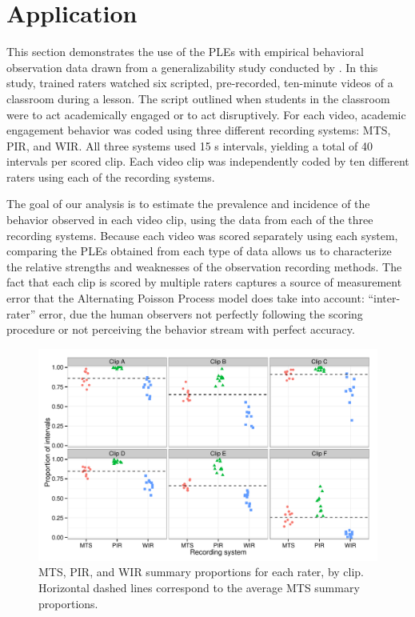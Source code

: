 \documentclass[man, noextraspace, floatsintext]{apa6}\usepackage[]{graphicx}\usepackage[]{color}
\makeatletter
\def\maxwidth{ %
  \ifdim\Gin@nat@width>\linewidth
    \linewidth
  \else
    \Gin@nat@width
  \fi
}
\newenvironment{knitrout}{}{} %
\makeatother
\begin{document}
\section{Application}
\label{sec:application}



This section demonstrates the use of the PLEs with empirical behavioral observation data drawn from a generalizability study conducted by \citet{Johnson2014}. 
In this study, trained raters watched six scripted, pre-recorded, ten-minute videos of a classroom during a lesson. 
The script outlined when students in the classroom were to act academically engaged or to act disruptively. 
For each video, academic engagement behavior was coded using three different recording systems: MTS, PIR, and WIR. 
All three systems used 15 s intervals, yielding a total of 40 intervals per scored clip.
Each video clip was independently coded by ten different raters using each of the recording systems. 

The goal of our analysis is to estimate the prevalence and incidence of the behavior observed in each video clip, using the data from each of the three recording systems. 
Because each video was scored separately using each system, comparing the PLEs obtained from each type of data allows us to characterize the relative strengths and weaknesses of the observation recording methods. The fact that each clip is scored by multiple raters captures a source of measurement error that the Alternating Poisson Process model does take into account: ``inter-rater'' error, due the human observers not perfectly following the scoring procedure or not perceiving the behavior stream with perfect accuracy.

\begin{knitrout}
\color{fgcolor}\begin{figure}[tb]


{\centering \includegraphics[width=\maxwidth]{fig/summary_prop} 

}

\caption[MTS, PIR, and WIR summary proportions for each rater, by clip]{MTS, PIR, and WIR summary proportions for each rater, by clip. Horizontal dashed lines correspond to the average MTS summary proportions.\label{fig:summary_prop}}
\end{figure}


\end{knitrout}
\end{document}
